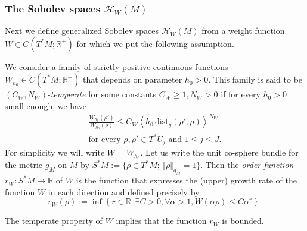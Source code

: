 \documentclass[AHL,Unicode,longabstracts,published]{cedram}
\newcommand{\clH}{\mathcal{H}}
\newcommand{\dist}{\mathrm{dist}}
\newcommand{\bbR}{\mathbb{R}}
\let\oldexists\exists
\renewcommand*{\exists}{\mathrel{\oldexists}}
\let\oldforall\forall
\renewcommand*{\forall}{\mathrel{\oldforall}}
\newcommand{\clH}{\mathcal{H}}
\newcommand{\bbR}{\mathbb{R}}
\begin{document}
\subsubsection{The Sobolev spaces \texorpdfstring{$\clH _{W}(M)$}{HW(M)}}\label{subsec:Sobolev-space}

Next we define generalized Sobolev spaces $\clH _{W}(M)$ from a weight function $W\in C(T^{*}M;\bbR^{+})$ for which we put the following assumption.

\begin{cBoxA}{}
\begin{defi}\label{def:temperate_W-1}
We consider a family of strictly positive continuous functions $W_{h_{0}}\in C(T^{*}M;\bbR^{+})$ that depends on parameter $h_{0}>0$. This family is said to be $(C_{W},N_{W})$-\emph{temperate} for some constants $C_{W}\geq1,N_{W}>0$ if for every $h_{0}>0$ small enough, we have
\begin{multline}\label{eq:temperate_property-W-2}
\frac{W_{h_{0}}\left(\rho'\right)}{W_{h_{0}}\left(\rho\right)}\leq C_{W}\left\langle h_{0}\,\dist_{g}\left(\rho',\rho\right)\right\rangle ^{N_{W}}
\\
\text{for every }\rho,\rho'\in T^{*}U_{j}\text{ and }1\le j\le J.
\end{multline}
For simplicity we will write $W=W_{h_{0}}$. Let us write the unit co-sphere bundle for the metric $g_{M}$ on $M$ by $S^{*}M:=\{ \rho\in T^{*}M;\,\Vert \rho\Vert _{g_{M}}=1\} $. Then the \emph{order function} $r_{W}:S^{*}M\to\bbR$ of $W$ is the function that expresses the (upper) growth rate of the function $W$ in each direction and defined precisely by
\begin{equation}\label{eq:def_order-2}
r_{W}\left(\rho\right):=\inf\left\{ r\in\bbR\:\mid\exists C>0,\forall\alpha>1,W\left(\alpha\rho\right)\leq C\alpha^{r}\right\}.
\end{equation}
\end{defi}
\end{cBoxA}

\begin{rema}
The temperate property of $W$ implies that the function $r_{W}$ is bounded.
\end{rema}
\end{document}
